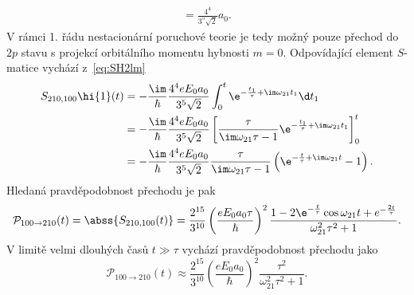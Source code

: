 \begin{solution}
\begin{subequations}
\begin{align}
                =\frac{4^{4}}{3^{5}\sqrt{2}}a_{0}.
        \end{align}            
    \end{subequations}
    V rámci 1. řádu nestacionární poruchové teorie je tedy možný pouze přechod do $2p$ stavu s projekcí orbitálního momentu hybnosti $m=0$.
    Odpovídající element $S$-matice vychází z~\eqref{eq:SH2lm}
    \begin{align}
        S_{210,100}\hi{1}(t)
            &=-\frac{\im}{\hbar}\frac{4^{4}eE_{0}a_{0}}{3^{5}\sqrt{2}}\int_{0}^{t}\e^{-\frac{t_{1}}{\tau}+\im\omega_{21}t_{1}}\d t_{1}\nonumber\\
            &=-\frac{\im}{\hbar}\frac{4^{4}eE_{0}a_{0}}{3^{5}\sqrt{2}}\left[\frac{\tau}{\im\omega_{21}\tau-1}\e^{-\frac{t_{1}}{\tau}+\im\omega_{21}t_{1}}\right]_{0}^{t}\nonumber\\
            &=-\frac{\im}{\hbar}\frac{4^{4}eE_{0}a_{0}}{3^{5}\sqrt{2}}\frac{\tau}{\im\omega_{21}\tau-1}\left(\e^{-\frac{t}{\tau}+\im\omega_{21}t}-1\right).
    \end{align}
    Hledaná pravděpodobnost přechodu je pak
    \begin{equation}
        \mathcal{P}_{100\rightarrow210}(t)
            =\abss{S_{210,100}(t)}
            =\frac{2^{15}}{3^{10}}\left(\frac{eE_{0}a_{0}\tau}{\hbar}\right)^{2}\frac{1-2\e^{-\frac{t}{\tau}}\cos{\omega_{21}t}+e^{-\frac{2t}{\tau}}}{\omega_{21}^{2}\tau^{2}+1}.
    \end{equation}
    V limitě velmi dlouhých časů $t\gg\tau$ vychází pravděpodobnost přechodu jako
    \begin{equation}
        \mathcal{P}_{100\rightarrow210}(t)
            \approx\frac{2^{15}}{3^{10}}\left(\frac{eE_{0}a_{0}}{\hbar}\right)^{2}\frac{\tau^{2}}{\omega_{21}^{2}\tau^{2}+1}.
    \end{equation}
\end{solution}